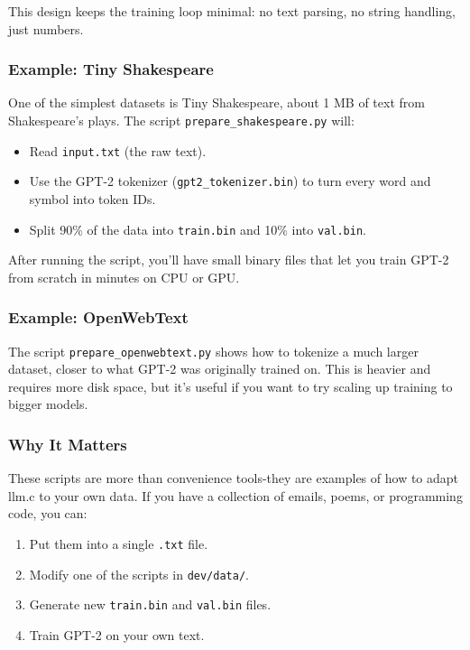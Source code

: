 \documentclass[
  letterpaper,
  DIV=11,
  numbers=noendperiod]{scrreprt}
\providecommand{\tightlist}{%
  \setlength{\itemsep}{0pt}\setlength{\parskip}{0pt}}
\begin{document}
This design keeps the training loop minimal: no text parsing, no string
handling, just numbers.

\subsubsection{Example: Tiny
Shakespeare}\label{example-tiny-shakespeare}

One of the simplest datasets is Tiny Shakespeare, about 1 MB of text
from Shakespeare's plays. The script \texttt{prepare\_shakespeare.py}
will:

\begin{itemize}
\tightlist
\item
  Read \texttt{input.txt} (the raw text).
\item
  Use the GPT-2 tokenizer (\texttt{gpt2\_tokenizer.bin}) to turn every
  word and symbol into token IDs.
\item
  Split 90\% of the data into \texttt{train.bin} and 10\% into
  \texttt{val.bin}.
\end{itemize}

After running the script, you'll have small binary files that let you
train GPT-2 from scratch in minutes on CPU or GPU.

\subsubsection{Example: OpenWebText}\label{example-openwebtext}

The script \texttt{prepare\_openwebtext.py} shows how to tokenize a much
larger dataset, closer to what GPT-2 was originally trained on. This is
heavier and requires more disk space, but it's useful if you want to try
scaling up training to bigger models.

\subsubsection{Why It Matters}\label{why-it-matters-2}

These scripts are more than convenience tools-they are examples of how
to adapt llm.c to your own data. If you have a collection of emails,
poems, or programming code, you can:

\begin{enumerate}
\def\labelenumi{\arabic{enumi}.}
\tightlist
\item
  Put them into a single \texttt{.txt} file.
\item
  Modify one of the scripts in \texttt{dev/data/}.
\item
  Generate new \texttt{train.bin} and \texttt{val.bin} files.
\item
  Train GPT-2 on your own text.
\end{enumerate}
\end{document}
